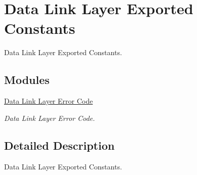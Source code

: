 \hypertarget{group___d_l___exported___constants}{}\section{Data Link Layer Exported Constants}
\label{group___d_l___exported___constants}


Data Link Layer Exported Constants.  


\subsection*{Modules}
\begin{DoxyCompactItemize}
\item 
\hyperlink{group___d_l___error___code}{Data Link Layer Error Code}
\begin{DoxyCompactList}\small\item\em Data Link Layer Error Code. \end{DoxyCompactList}\end{DoxyCompactItemize}


\subsection{Detailed Description}
Data Link Layer Exported Constants. 

